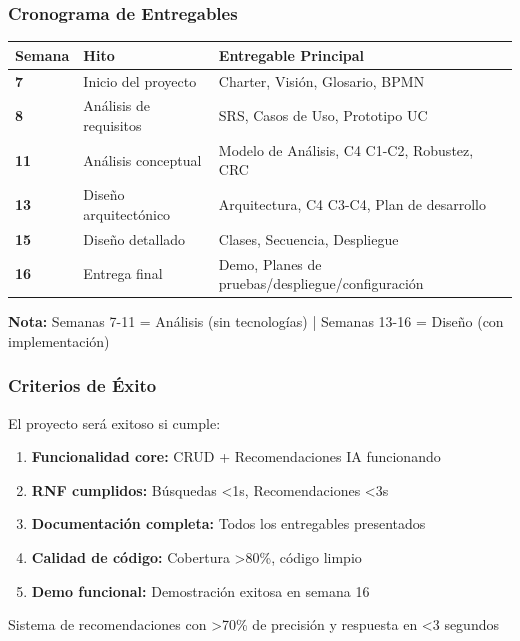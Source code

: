 \documentclass[aspectratio=169]{beamer}
\begin{document}
\begin{frame}
\frametitle{Cronograma de Entregables}

\begin{table}
\centering
\small
\begin{tabular}{p{1.5cm}p{3.5cm}p{6cm}}
\toprule
\textbf{Semana} & \textbf{Hito} & \textbf{Entregable Principal} \\
\midrule
\textbf{7} & Inicio del proyecto & Charter, Visión, Glosario, BPMN \\
\textbf{8} & Análisis de requisitos & SRS, Casos de Uso, Prototipo UC \\
\textbf{11} & Análisis conceptual & Modelo de Análisis, C4 C1-C2, Robustez, CRC \\
\textbf{13} & Diseño arquitectónico & Arquitectura, C4 C3-C4, Plan de desarrollo \\
\textbf{15} & Diseño detallado & Clases, Secuencia, Despliegue \\
\textbf{16} & Entrega final & Demo, Planes de pruebas/despliegue/configuración \\
\bottomrule
\end{tabular}
\end{table}

\vspace{0.3cm}

\textbf{Nota:} Semanas 7-11 = Análisis (sin tecnologías) | Semanas 13-16 = Diseño (con implementación)

\end{frame}

\begin{frame}
\frametitle{Criterios de Éxito}

El proyecto será exitoso si cumple:

\begin{enumerate}
\item \checkmark \textbf{Funcionalidad core:} CRUD + Recomendaciones IA funcionando
\item \checkmark \textbf{RNF cumplidos:} Búsquedas <1s, Recomendaciones <3s
\item \checkmark \textbf{Documentación completa:} Todos los entregables presentados
\item \checkmark \textbf{Calidad de código:} Cobertura >80\%, código limpio
\item \checkmark \textbf{Demo funcional:} Demostración exitosa en semana 16
\end{enumerate}

\vspace{0.5cm}

\begin{tcolorbox}[colback=green!5, colframe=green!50, title=Meta Principal]
Sistema de recomendaciones con >70\% de precisión y respuesta en <3 segundos
\end{tcolorbox}

\end{frame}
\end{document}

